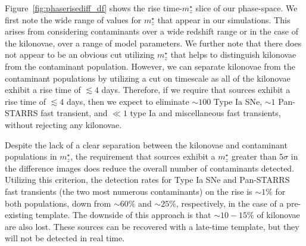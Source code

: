 Figure~\ref{fig:phaserisediff_df} shows the rise time-$m^{\star}_z$ slice of our phase-space. We first note the wide range of values for $m^{\star}_z$ that appear in our simulations. This arises from considering contaminants over a wide redshift range or in the case of the kilonovae, over a range of model parameters. We further note that there does not appear to be an obvious cut utilizing $m^{\star}_z$ that helps to distinguish kilonovae from the contaminant population. However, we can separate kilonovae from the contaminant populations by utilizing a cut on timescale as all of the kilonovae exhibit a rise time of $\lesssim 4$ days. Therefore, if we require that sources exhibit a rise time of $\lesssim 4$ days, then we expect to eliminate $\sim 100$ Type Ia SNe, $\sim 1$ Pan-STARRS fast transient, and $\ll1$ type Ia and miscellaneous fast transients, without rejecting any kilonovae.
   
Despite the lack of a clear separation between the kilonovae and contaminant populations in $m^{\star}_z$, the requirement that sources exhibit a $m^{\star}_z$ greater than $5\sigma$ in the difference images does reduce the overall number of contaminants detected. Utilizing this criterion, the detection rates for Type Ia SNe and Pan-STARRS fast transients (the two most numerous contaminants) on the rise is $\sim1\%$ for both populations, down from $\sim60\%$ and $\sim25\%$, respectively, in the case of a pre-existing template. The downside of this approach is that $\sim10-15\%$ of kilonovae are also lost. These sources can be recovered with a late-time template, but they will not be detected in real time. 

